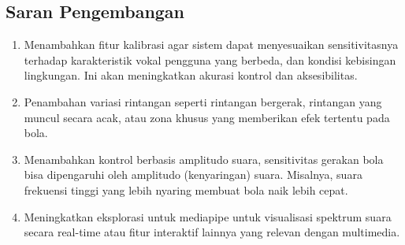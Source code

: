\documentclass[11pt,a4paper]{article}
\begin{document}
\subsection{Saran Pengembangan}
\begin{enumerate}
    \item Menambahkan fitur kalibrasi agar sistem dapat menyesuaikan sensitivitasnya terhadap karakteristik vokal pengguna yang berbeda, dan kondisi kebisingan lingkungan. Ini akan meningkatkan akurasi kontrol dan aksesibilitas.
    \item Penambahan variasi rintangan seperti rintangan bergerak, rintangan yang muncul secara acak, atau zona khusus yang memberikan efek tertentu pada bola. 
    \item Menambahkan kontrol berbasis amplitudo suara, sensitivitas gerakan bola bisa dipengaruhi oleh amplitudo (kenyaringan) suara. Misalnya, suara frekuensi tinggi yang lebih nyaring membuat bola naik lebih cepat.
    \item Meningkatkan eksplorasi untuk mediapipe untuk visualisasi spektrum suara secara real-time atau fitur interaktif lainnya yang relevan dengan multimedia.
\end{enumerate}

\newpage


\end{document}
